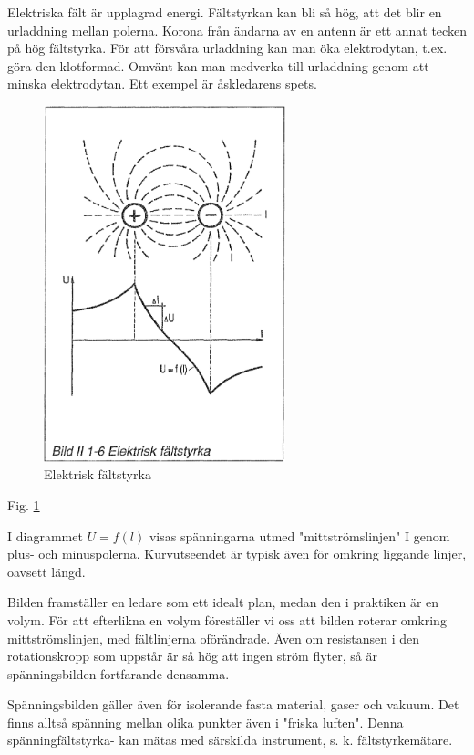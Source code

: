 Elektriska fält är upplagrad energi. Fältstyrkan kan bli så hög, att det blir
en urladdning mellan polerna. Korona från ändarna av en antenn är ett annat
tecken på hög fältstyrka. För att försvåra urladdning kan man öka elektrodytan,
t.ex. göra den klotformad. Omvänt kan man medverka till urladdning genom att
minska elektrodytan. Ett exempel är åskledarens spets.


\begin{figure}
\begin{center}
\includegraphics[width=7cm]{images/bild_2_1-06}
\caption{Elektrisk fältstyrka}
\label{fig:BildII1-6}
\end{center}
\end{figure}

Fig. \ref{fig:BildII1-6}

I diagrammet \(U = f(l)\) visas spänningarna utmed "mittströmslinjen" I genom
plus- och minuspolerna. Kurvutseendet är typisk även för omkring liggande
linjer, oavsett längd.

Bilden framställer en ledare som ett idealt plan, medan den i praktiken är en
volym. För att efterlikna en volym föreställer vi oss att bilden roterar
omkring mittströmslinjen, med fältlinjerna oförändrade. Även om resistansen i
den rotationskropp som uppstår är så hög att ingen ström flyter, så är
spänningsbilden fortfarande densamma.

Spänningsbilden gäller även för isolerande fasta material, gaser och vakuum.
Det finns alltså spänning mellan olika punkter även i "friska luften". Denna
spänningfältstyrka- kan mätas med särskilda instrument, s. k. fältstyrkemätare.

